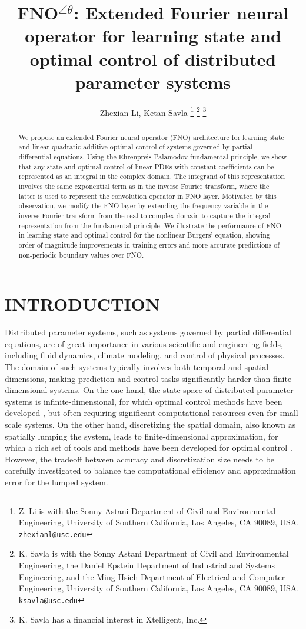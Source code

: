 \documentclass[letterpaper, 10 pt, conference]{ieeeconf}  %
\title{\LARGE \bf
FNO$^{\angle \theta}$: Extended Fourier neural operator for learning state and optimal control of distributed parameter systems
}
\author{Zhexian Li, Ketan Savla%
\thanks{Z. Li is with the Sonny Astani Department of Civil and Environmental Engineering, University of Southern California, Los Angeles, CA 90089, USA. {\tt\small zhexianl@usc.edu}}%
\thanks{K. Savla is with the Sonny Astani Department of Civil and Environmental Engineering, the Daniel Epstein Department of Industrial and Systems Engineering, and the Ming Hsieh Department of Electrical and Computer Engineering, University of Southern California, Los Angeles, CA 90089, USA. {\tt\small ksavla@usc.edu}}
\thanks{
 K. Savla has a financial interest in Xtelligent, Inc.}%
}
\begin{document}
\maketitle
\thispagestyle{empty}
\pagestyle{empty}


\begin{abstract}
We propose an extended Fourier neural operator (FNO) architecture for learning state and linear quadratic additive optimal control of systems governed by partial differential equations.
Using the Ehrenpreis-Palamodov fundamental principle, we show that any state and optimal control of linear PDEs with constant coefficients can be represented as an integral in the complex domain.
The integrand of this representation involves the same exponential term as in the inverse Fourier transform, where the latter is used to represent the convolution operator in FNO layer.
Motivated by this observation, we modify the FNO layer by extending the frequency variable in the inverse Fourier transform from the real to complex domain to capture the integral representation from the fundamental principle.
We illustrate the performance of FNO in learning state and optimal control for the nonlinear Burgers' equation, showing order of magnitude improvements in training errors and more accurate predictions of non-periodic boundary values over FNO.

\end{abstract}


\section{INTRODUCTION}

Distributed parameter systems, such as systems governed by partial differential equations, are of great importance in various scientific and engineering fields, including fluid dynamics, climate modeling, and control of physical processes.
The domain of such systems typically involves both temporal and spatial dimensions, making prediction and control tasks significantly harder than finite-dimensional systems.
On the one hand, the state space of distributed parameter systems is infinite-dimensional, for which optimal control methods have been developed \cite{lions1970optimal,hinze2008optimization}, but often requiring significant computational resources even for small-scale systems.
On the other hand,
discretizing the spatial domain, also known as spatially lumping the system, leads to finite-dimensional approximation, for which a rich set of tools and methods have been developed for optimal control \cite{bryson2018applied}. 
However, the tradeoff between accuracy and discretization size needs to be carefully investigated to balance the computational efficiency and approximation error for the lumped system.
\end{document}
